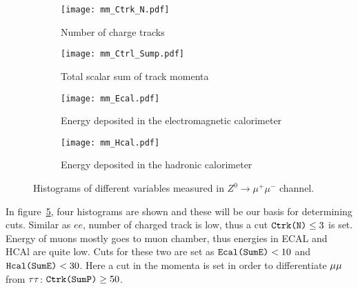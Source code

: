 \begin{figure}[H]  
	\begin{subfigure}[t]{0.5\textwidth}
	\begin{center}
		\texttt{[image: mm\_Ctrk\_N.pdf]}
	\end{center}
	\caption{Number of charge tracks}
	\label{fig:}
	\end{subfigure}%
	\begin{subfigure}[t]{0.5\textwidth}
	\begin{center}
		\texttt{[image: mm\_Ctrl\_Sump.pdf]}
	\end{center}
	\caption{Total scalar sum of track momenta}
	\label{fig:}
	\end{subfigure}
	
	\begin{subfigure}[t]{0.5\textwidth}
	\begin{center}
		\texttt{[image: mm\_Ecal.pdf]}
	\end{center}
	\caption{Energy deposited in the electromagnetic calorimeter}
	\label{fig:}
	\end{subfigure}%
	\begin{subfigure}[t]{0.5\textwidth}
	\begin{center}
		\texttt{[image: mm\_Hcal.pdf]}
	\end{center}
	\caption{Energy deposited in the hadronic calorimeter}
	\label{fig:}
	\end{subfigure}
	\caption{Histograms of different variables measured in $  {Z}^0\rightarrow \mu^+\mu^- $ channel. }
	\label{Fig:histograms_mm}
\end{figure}
In figure~\ref{Fig:histograms_mm}, four histograms are shown and these will be our basis for determining cuts. Similar as $ee$, number of charged track is low, thus a cut $\verb|Ctrk(N)| \leq 3$ is set. Energy of muons mostly goes to muon chamber, thus energies in ECAL and HCAl are quite low. Cuts for these two are set as $\verb|Ecal(SumE)| < 10$ and $\verb|Hcal(SumE)| < 30$. Here a cut in the momenta is set in order to differentiate $\mu\mu$ from $\tau\tau$: $\verb|Ctrk(SumP)| \geq 50$.

